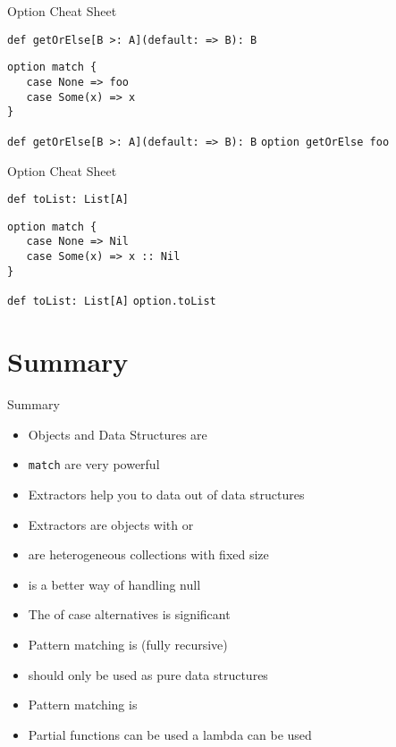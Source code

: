 \begin{frame}[fragile]{Option Cheat Sheet}
\begin{alertblock}{\lstinline!def getOrElse[B >: A](default: => B): B!}
\begin{lstlisting}
option match {
   case None => foo
   case Some(x) => x
}
\end{lstlisting}
\end{alertblock}
\begin{exampleblock}{\lstinline!def getOrElse[B >: A](default: => B): B!}
\lstinline!option getOrElse foo!
\end{exampleblock}
\end{frame}

\begin{frame}[fragile]{Option Cheat Sheet}
\begin{alertblock}{\lstinline!def toList: List[A]!}
\begin{lstlisting}
option match {
   case None => Nil
   case Some(x) => x :: Nil
}
\end{lstlisting}
\end{alertblock}
\begin{exampleblock}{\lstinline!def toList: List[A]!}
\lstinline!option.toList!
\end{exampleblock}
\end{frame}

\section{Summary}
\begin{frame}{Summary}
\begin{itemize}
  \item Objects and Data Structures are 
  \item \lstinline!match!  are very powerful
  \item Extractors help you to  data out of data structures
  \item Extractors are objects with  or 
  \item {} are heterogeneous collections with fixed size
  \item {} is a better way of handling \alert{null}
  \item The  of case alternatives is significant
  \item Pattern matching is  (fully recursive)
  \item {} should only be used as pure data structures
  \item Pattern matching is 
  \item Partial functions can be used  a lambda can be used  
\end{itemize}
\end{frame}